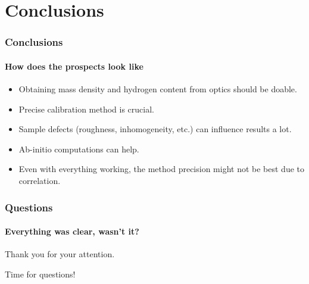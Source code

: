 \documentclass{beamer}
\begin{document}
\section{Conclusions}
\begin{frame}
   \frametitle{Conclusions}
   \framesubtitle{How does the prospects look like}

   \begin{itemize}
	\item Obtaining mass density and hydrogen content from optics should be doable.
   \item Precise calibration method is crucial.
   \item Sample defects (roughness, inhomogeneity, etc.) can influence results a lot.
	\item Ab-initio computations can help.
	\item Even with everything working, the method precision might not be best due to correlation.
   \end{itemize}

\end{frame}

\begin{frame}
    \frametitle{Questions}
    \framesubtitle{Everything was clear, wasn't it?}

	\begin{center}
	Thank you for your attention.
	\end{center}
	\begin{center}
	Time for questions!
	\end{center}

\end{frame}
\end{document}
